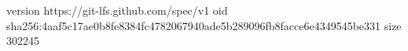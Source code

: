version https://git-lfs.github.com/spec/v1
oid sha256:4aaf5c17ae0b8fe8384fc4782067940ade5b289096fb8facce6e4349545be331
size 302245
